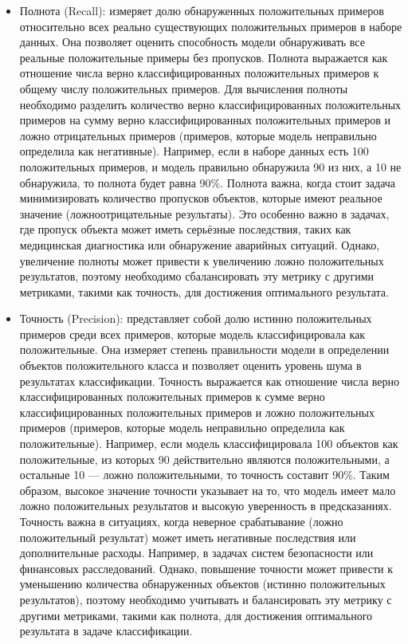 \begin{enumerate}
\begin{itemize}
            \item Полнота (Recall): измеряет долю обнаруженных положительных примеров относительно всех реально существующих положительных примеров в наборе данных. Она позволяет оценить способность модели обнаруживать все реальные положительные примеры без пропусков. Полнота выражается как отношение числа верно классифицированных положительных примеров к общему числу положительных примеров. Для вычисления полноты необходимо разделить количество верно классифицированных положительных примеров на сумму верно классифицированных положительных примеров и ложно отрицательных примеров (примеров, которые модель неправильно определила как негативные). Например, если в наборе данных есть 100 положительных примеров, и модель правильно обнаружила 90 из них, а 10 не обнаружила, то полнота будет равна 90\%. Полнота важна, когда стоит задача минимизировать количество пропусков объектов, которые имеют реальное значение (ложноотрицательные результаты). Это особенно важно в задачах, где пропуск объекта может иметь серьёзные последствия, таких как медицинская диагностика или обнаружение аварийных ситуаций. Однако, увеличение полноты может привести к увеличению ложно положительных результатов, поэтому необходимо сбалансировать эту метрику с другими метриками, такими как точность, для достижения оптимального результата.
            
            \item Точность (Precision): представляет собой долю истинно положительных примеров среди всех примеров, которые модель классифицировала как положительные. Она измеряет степень правильности модели в определении объектов положительного класса и позволяет оценить уровень шума в результатах классификации. Точность выражается как отношение числа верно классифицированных положительных примеров к сумме верно классифицированных положительных примеров и ложно положительных примеров (примеров, которые модель неправильно определила как положительные). Например, если модель классифицировала 100 объектов как положительные, из которых 90 действительно являются положительными, а остальные 10 — ложно положительными, то точность составит 90\%. Таким образом, высокое значение точности указывает на то, что модель имеет мало ложно положительных результатов и высокую уверенность в предсказаниях. Точность важна в ситуациях, когда неверное срабатывание (ложно положительный результат) может иметь негативные последствия или дополнительные расходы. Например, в задачах систем безопасности или финансовых расследований. Однако, повышение точности может привести к уменьшению количества обнаруженных объектов (истинно положительных результатов), поэтому необходимо учитывать и балансировать эту метрику с другими метриками, такими как полнота, для достижения оптимального результата в задаче классификации.
            

\end{itemize}
\end{enumerate}
